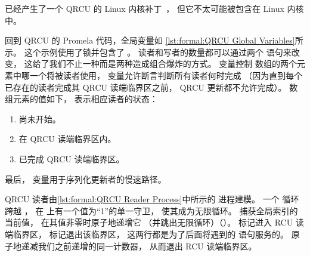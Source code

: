 已经产生了一个 QRCU 的 Linux 内核补丁~\cite{PaulMcKenney2007QRCUpatch}，
但它不太可能被包含在 Linux 内核中。

\begin{listing}

\caption{QRCU 全局变量}
\label{lst:formal:QRCU Global Variables}
\end{listing}

回到 QRCU 的 Promela 代码，全局变量如
\cref{lst:formal:QRCU Global Variables}所示。
这个示例使用了锁并包含了 。
读者和写者的数量都可以通过两个  语句来改变，
这给了我们不止一种而是两种造成组合爆炸的方式。
 变量控制  数组的两个元素中哪一个将被读者使用，
 变量允许断言判断所有读者何时完成
（因为直到每个已存在的读者完成其 QRCU 读端临界区之前，
QRCU 更新都不允许完成）。
 数组元素的值如下，
表示相应读者的状态：

\begin{enumerate}[label={\arabic*}:,start=0,itemsep=0pt]
\item	尚未开始。
\item	在 QRCU 读端临界区内。
\item	已完成 QRCU 读端临界区。
\end{enumerate}

最后， 变量用于序列化更新者的慢速路径。

\begin{listing}

\caption{QRCU 读者进程}
\label{lst:formal:QRCU Reader Process}
\end{listing}

\begin{fcvref}
QRCU 读者由\cref{lst:formal:QRCU Reader Process}中所示的
 进程建模。
一个  循环跨越 ，
在  上有一个值为``1''的单一守卫，
使其成为无限循环。
 捕获全局索引的当前值，
 在其值非零时原子地递增它
（并跳出无限循环）（）。
 标记进入 RCU 读端临界区，
 标记退出该临界区，
这两行都是为了后面将遇到的  语句服务的。
 原子地递减我们之前递增的同一计数器，
从而退出 RCU 读端临界区。
\end{fcvref}

\begin{listing}

\caption{QRCU 无序求和}
\label{lst:formal:QRCU Unordered Summation}
\end{listing}

